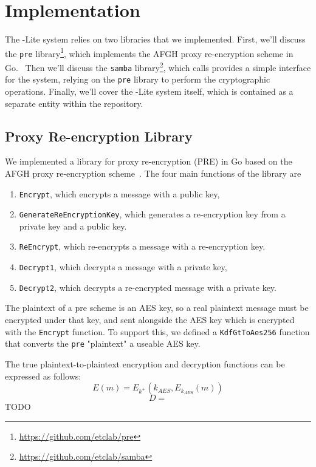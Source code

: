 \section{Implementation}
\label{sec:implementation}

The \SystemName-Lite system relies on two libraries that we implemented. First, we'll discuss the \texttt{pre} library\footnote{\url{https://github.com/etclab/pre}},
which implements the AFGH proxy re-encryption scheme in Go.~\cite{05-ndss-improved_proxy_reencryption}
Then we'll discuss the \texttt{samba} library\footnote{\url{https://github.com/etclab/samba}}, which calls provides a simple interface for the \SystemName system, relying on the \texttt{pre} library to perform the cryptographic operations.
Finally, we'll cover the \SystemName-Lite system itself, which is contained as a separate entity within the \SystemName repository.

\subsection{Proxy Re-encryption Library}
\label{sec:PRE}
%
We implemented a library for proxy re-encryption (PRE) in Go based on the AFGH proxy re-encryption scheme~\cite{05-ndss-improved_proxy_reencryption}.
The four main functions of the library are 
\begin{enumerate}
	\item \texttt{Encrypt}, which encrypts a message with a public key,
	\item \texttt{GenerateReEncryptionKey}, which generates a re-encryption key from a private key and a public key.
	\item \texttt{ReEncrypt}, which re-encrypts a message with a re-encryption key.
	\item \texttt{Decrypt1}, which decrypts a message with a private key,
	\item \texttt{Decrypt2}, which decrypts a re-encrypted message with a private key.
\end{enumerate}

The plaintext of a pre scheme is an AES key, so a real plaintext message must be encrypted under that key, and sent alongside the AES key which is encrypted with the \texttt{Encrypt} function.
To support this, we defined a \texttt{KdfGtToAes256} function that converts the \texttt{pre} "plaintext" a useable AES key.

The true plaintext-to-plaintext encryption and decryption functions can be expressed as follows:
$$E(m) = E_{k^+}(k_{AES},E_{k_{AES}}(m))$$
$$D = $$
\color{red}TODO\color{black}



